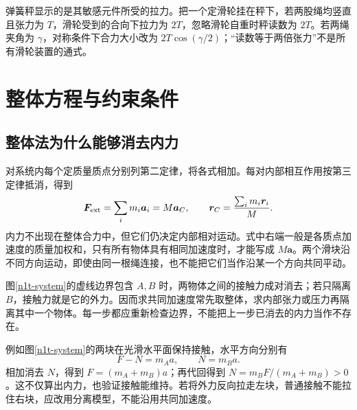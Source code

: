 弹簧秤显示的是其敏感元件所受的拉力。把一个定滑轮挂在秤下，若两股绳均竖直且张力为 $T$，滑轮受到的合向下拉力为 $2T$，忽略滑轮自重时秤读数为 $2T$。若两绳夹角为 $\gamma$，对称条件下合力大小改为 $2T\cos(\gamma/2)$；“读数等于两倍张力”不是所有滑轮装置的通式。



\section{整体方程与约束条件}
\subsection{整体法为什么能够消去内力}
对系统内每个定质量质点分别列第二定律，将各式相加。每对内部相互作用按第三定律抵消，得到
\begin{equation}\label{n1eq-system}
\bm F_{\rm ext}=\sum_i m_i\bm a_i=M\bm a_C,
\qquad \bm r_C=\frac{\sum_i m_i\bm r_i}{M}.
\end{equation}
内力不出现在整体合力中，但它们仍决定内部相对运动。式中右端一般是各质点加速度的质量加权和，只有所有物体具有相同加速度时，才能写成 $M\bm a$。两个滑块沿不同方向运动，即使由同一根绳连接，也不能把它们当作沿某一个方向共同平动。


图\ref{n1t-system}的虚线边界包含 $A,B$ 时，两物体之间的接触力成对消去；若只隔离 $B$，接触力就是它的外力。因而求共同加速度常先取整体，求内部张力或压力再隔离其中一个物体。每一步都应重新检查边界，不能把上一步已消去的内力当作不存在。


例如图\ref{n1t-system}的两块在光滑水平面保持接触，水平方向分别有
\[
F-N=m_Aa,\qquad N=m_Ba.
\]
相加消去 $N$，得到 $F=(m_A+m_B)a$；再代回得到 $N=m_BF/(m_A+m_B)>0$。这不仅算出内力，也验证接触能维持。若将外力反向拉走左块，普通接触不能拉住右块，应改用分离模型，不能沿用共同加速度。

